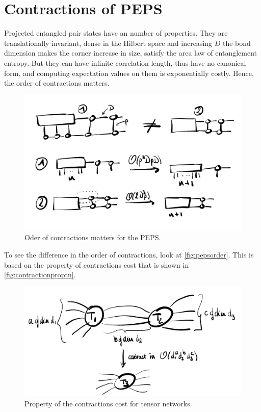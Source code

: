    \section{Contractions of PEPS}
        
        Projected entangled pair states have an number of properties. They are translationally invariant, dense in the Hilbert space and increasing $D$ the bond dimension makes the corner increase in size, satisfy the area law of entanglement entropy. But they can have infinite correlation length, thus have no canonical form, and computing expectation values on them is exponentially costly. Hence, the order of contractions matters.
        
        \begin{figure}[h!]
            \centering
            \includegraphics[scale=0.2]{graphs/pepsorder.png}
            \caption{Oder of contractions matters for the PEPS.}
            \label{fig:pepsorder}
        \end{figure}

        To see the difference in the order of contractions, look at \autoref{fig:pepsorder}. This is based on the property of contractions cost that is shown in \autoref{fig:contractionproptn}.

        \begin{figure}[h!]
            \centering
            \includegraphics[scale=0.2]{graphs/contractionproptn.png}
            \caption{Property of the contractions cost for tensor networks.}
            \label{fig:contractionproptn}
        \end{figure}


